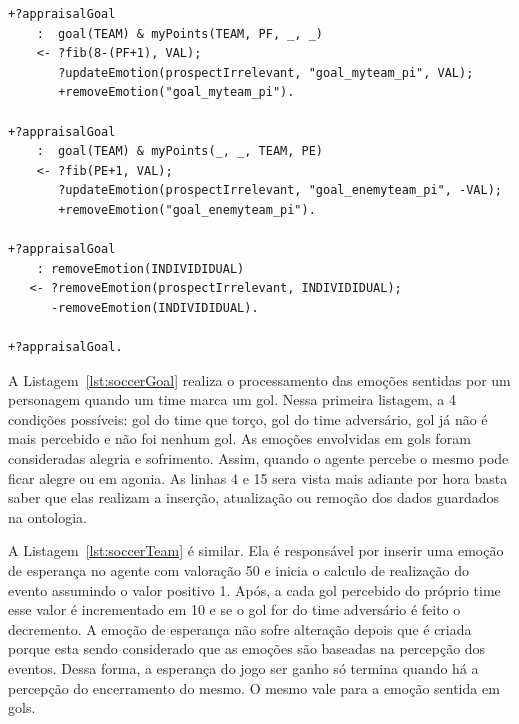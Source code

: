 \begin{center}
    \begin{minipage}{120mm}
	\lstset{linewidth=120mm}
	\begin{lstlisting}[frame=trbl,
caption=Parte do código do agente referente à avaliação de gol,
label=lst:soccerGoal]
+?appraisalGoal
    :  goal(TEAM) & myPoints(TEAM, PF, _, _)
    <- ?fib(8-(PF+1), VAL);
       ?updateEmotion(prospectIrrelevant, "goal_myteam_pi", VAL);
       +removeEmotion("goal_myteam_pi").

+?appraisalGoal
    :  goal(TEAM) & myPoints(_, _, TEAM, PE)
    <- ?fib(PE+1, VAL);
       ?updateEmotion(prospectIrrelevant, "goal_enemyteam_pi", -VAL);
       +removeEmotion("goal_enemyteam_pi").

+?appraisalGoal
    : removeEmotion(INDIVIDIDUAL)
   <- ?removeEmotion(prospectIrrelevant, INDIVIDIDUAL);
      -removeEmotion(INDIVIDIDUAL).

+?appraisalGoal.
	\end{lstlisting}
    \end{minipage}
\end{center}

A Listagem~\ref{lst:soccerGoal} realiza o processamento das emoções sentidas
por um personagem quando um time marca um gol. Nessa primeira listagem, a 4
condições possíveis: gol do time que torço, gol do time adversário, gol já
não é mais percebido e não foi nenhum gol. As emoções envolvidas em gols foram
consideradas alegria e sofrimento. Assim, quando o agente percebe o mesmo pode
ficar alegre ou em agonia. As linhas 4 e 15 sera vista mais adiante por hora
basta saber que elas realizam a inserção, atualização ou remoção dos dados
guardados na ontologia.

A Listagem~\ref{lst:soccerTeam} é similar. Ela é responsável por inserir uma
emoção de esperança no agente com valoração 50 e inicia o calculo de
realização do evento assumindo o valor positivo 1. Após, a cada gol percebido
do próprio time esse valor é incrementado em 10 e se o gol for do time
adversário é feito o decremento. A emoção de esperança não sofre alteração
depois que é criada porque esta sendo considerado que as emoções são baseadas
na percepção dos eventos. Dessa forma, a esperança do jogo ser ganho só
termina quando há a percepção do encerramento do mesmo. O mesmo vale para a
emoção sentida em gols.

